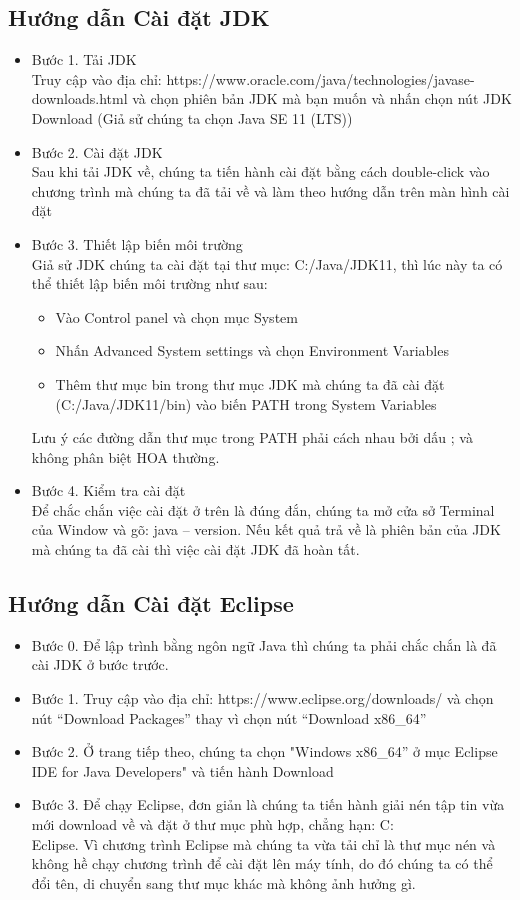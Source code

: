 \subsection{Hướng dẫn Cài đặt JDK}
\begin{itemize}
\item Bước 1. Tải JDK\\
Truy cập vào địa chỉ: https://www.oracle.com/java/technologies/javase-downloads.html và chọn phiên bản JDK mà bạn muốn và nhấn chọn nút JDK Download (Giả sử chúng ta chọn Java SE 11 (LTS))
\item Bước 2. Cài đặt JDK\\
Sau khi tải JDK về, chúng ta tiến hành cài đặt bằng cách double-click vào chương trình mà chúng ta đã tải về và làm theo hướng dẫn trên màn hình cài đặt
\item Bước 3. Thiết lập biến môi trường\\
Giả sử JDK chúng ta cài đặt tại thư mục: C:/Java/JDK11, thì lúc này ta có thể thiết lập biến môi trường như sau:
\begin{itemize}
\item Vào Control panel và chọn mục System
\item Nhấn Advanced System settings và chọn Environment Variables
\item Thêm thư mục bin trong thư mục JDK mà chúng ta đã cài đặt (C:/Java/JDK11/bin) vào biến PATH trong System Variables
\end{itemize}
\indent Lưu ý các đường dẫn thư mục trong PATH phải cách nhau bởi dấu ; và không phân biệt HOA thường.
\item Bước 4. Kiểm tra cài đặt\\
Để chắc chắn việc cài đặt ở trên là đúng đắn, chúng ta mở cửa sở Terminal của Window và gõ: {\ttfamily java – version}. Nếu kết quả trả về là phiên bản của JDK mà chúng ta đã cài thì việc cài đặt JDK đã hoàn tất.
\end{itemize}
\subsection{Hướng dẫn Cài đặt Eclipse}
\begin{itemize}
\item Bước 0. Để lập trình bằng ngôn ngữ Java thì chúng ta phải chắc chắn là đã cài JDK ở bước trước.
\item Bước 1. Truy cập vào địa chỉ: https://www.eclipse.org/downloads/ và chọn nút “Download Packages” thay vì chọn nút “Download x86\_64” 
\item Bước 2. Ở trang tiếp theo, chúng ta chọn "Windows x86\_64” ở mục Eclipse IDE for Java Developers" và tiến hành Download
\item Bước 3. Để chạy Eclipse, đơn giản là chúng ta tiến hành giải nén tập tin vừa mới download về và đặt ở thư mục phù hợp, chẳng hạn: C:\\Eclipse. Vì chương trình Eclipse mà chúng ta vừa tải chỉ là thư mục nén và không hề chạy chương trình để cài đặt lên máy tính, do đó chúng ta có thể đổi tên, di chuyển sang thư mục khác mà không ảnh hưởng gì.
\end{itemize}
